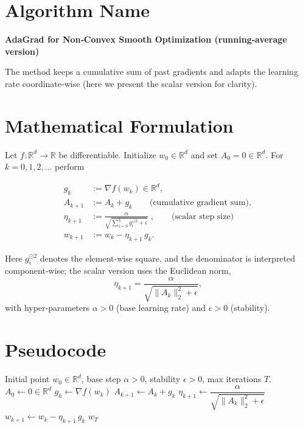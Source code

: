 \documentclass{article}
\newcommand{\R}{\mathbb{R}}
\begin{document}
\section*{Algorithm Name}
\textbf{AdaGrad for Non‑Convex Smooth Optimization (running‑average version)}  

The method keeps a cumulative sum of past gradients and adapts the learning
rate coordinate‑wise (here we present the scalar version for clarity).

\section*{Mathematical Formulation}
Let $f:\R^d\rightarrow\R$ be differentiable.  
Initialize $w_0\in\R^d$ and set $A_0=0\in\R^d$.  
For $k=0,1,2,\dots$ perform  

\[
\begin{aligned}
g_k &:= \nabla f(w_k) \in\R^d,\\[4pt]
A_{k+1} &:= A_k + g_k \qquad\text{(cumulative gradient sum)},\\[4pt]
\eta_{k+1} &:= \frac{\alpha}{\sqrt{\displaystyle\sum_{i=0}^{k} g_i^{\odot 2}+\epsilon}}\;,
\qquad\text{(scalar step size)}\\[4pt]
w_{k+1} &:= w_k - \eta_{k+1}\, g_k .
\end{aligned}
\]

Here $g_i^{\odot 2}$ denotes the element‑wise square, and the denominator is
interpreted component‑wise; the scalar version uses the Euclidean norm,
\[
\eta_{k+1}= \frac{\alpha}{\sqrt{\|A_k\|_2^{2}+\epsilon}} ,
\]
with hyper‑parameters $\alpha>0$ (base learning rate) and $\epsilon>0$ (stability).

\section*{Pseudocode}
\begin{algorithm}[H]
\caption{AdaGrad (scalar step size)}
\begin{algorithmic}[1]
\Require Initial point $w_0\in\R^d$, base step $\alpha>0$, stability $\epsilon>0$,
        max iterations $T$.
\State $A_0\gets 0\in\R^d$
    \State $g_k \gets \nabla f(w_k)$
    \State $A_{k+1} \gets A_k + g_k$
    \State $\eta_{k+1} \gets \dfrac{\alpha}{\sqrt{\|A_k\|_2^{2}+\epsilon}}$
    \State $w_{k+1} \gets w_k - \eta_{k+1}\, g_k$
\EndFor
\State \Return $w_T$
\end{algorithmic}
\end{algorithm}
\end{document}
